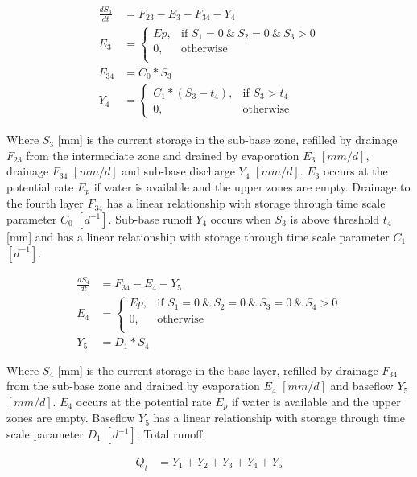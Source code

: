 \begin{align}
	\frac{dS_3}{dt} &= F_{23}-E_3-F_{34}-Y_4\\
	E_3 &= \begin{cases}
		Ep, &\text{if } S_1 = 0 ~\&~ S_2 = 0 ~\&~ S_3 > 0\\
		0, & \text{otherwise} \\
	\end{cases} \\
	F_{34} &= C_0*S_3\\
	Y_4 &= 
	\begin{cases}
		C_1*(S_3-t_4), & \text{if } S_3 > t_4 \\
		0, & \text{otherwise}
	\end{cases}
\end{align}

Where $S_3$ [mm] is the current storage in the sub-base zone, refilled by drainage $F_{23}$ from the intermediate zone and drained by evaporation $E_3$ $[mm/d]$, drainage $F_{34}$ $[mm/d]$ and sub-base discharge $Y_4$ $[mm/d]$. $E_3$ occurs at the potential rate $E_p$ if water is available and the upper zones are empty. Drainage to the fourth layer $F_{34}$ has a linear relationship with storage through time scale parameter $C_0$ $[d^{-1}]$. Sub-base runoff $Y_4$ occurs when $S_3$ is above threshold $t_4$ [mm] and has a linear relationship with storage through time scale parameter $C_1$ $[d^{-1}]$.

\begin{align}
	\frac{dS_4}{dt} &= F_{34}-E_4-Y_5\\
	E_4 &= \begin{cases}
		Ep, &\text{if } S_1 = 0 ~\&~ S_2 = 0 ~\&~ S_3 = 0 ~\&~ S_4 > 0\\
		0, & \text{otherwise} \\
	\end{cases} \\
	Y_5 &= D_1*S_4
\end{align}

Where $S_4$ [mm] is the current storage in the base layer, refilled by drainage $F_{34}$ from the sub-base zone and drained by evaporation $E_4$ $[mm/d]$ and baseflow $Y_5$ $[mm/d]$. $E_4$ occurs at the potential rate $E_p$ if water is available and the upper zones are empty. Baseflow $Y_5$ has a linear relationship with storage through time scale parameter $D_1$ $[d^{-1}]$. Total runoff:

\begin{align}
	Q_t &= Y_1+Y_2+Y_3+Y_4+Y_5
\end{align}


